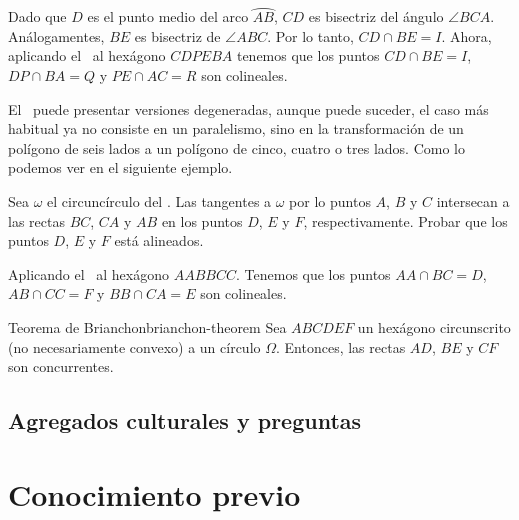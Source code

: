 \begin{solution}
    Dado que $D$ es el punto medio del arco $\wideparen{AB}$, $CD$ es bisectriz del ángulo $\angle BCA$.
    Análogamentes, $BE$ es bisectriz de $\angle ABC$.
    Por lo tanto, $CD \cap BE = I$.
    Ahora, aplicando el~ al hexágono $CDPEBA$ tenemos que los puntos $CD \cap BE = I$, $DP \cap BA = Q$ y $PE \cap AC = R$ son colineales.
\end{solution}


El~ puede presentar versiones degeneradas, aunque puede suceder, el caso más habitual ya no consiste en un paralelismo, sino en la transformación de un polígono de seis lados a un polígono de cinco, cuatro o tres lados.
Como lo podemos ver en el siguiente ejemplo.

\begin{section-example.tcb}{}{}
    Sea $\omega$ el circuncírculo del .
    Las tangentes a $\omega$ por lo puntos $A$, $B$ y $C$ intersecan a las rectas $BC$, $CA$ y $AB$ en los puntos $D$, $E$ y $F$, respectivamente.
    Probar que los puntos $D$, $E$ y $F$ está alineados.
\end{section-example.tcb}

\begin{solution}
    Aplicando el~ al hexágono $AABBCC$.
    Tenemos que los puntos $AA \cap BC = D$, $AB \cap CC = F$ y $BB \cap CA = E$ son colineales.
\end{solution}

\begin{remark.tcb}

\end{remark.tcb}



\newpage
\begin{section-theorem.tcb}{Teorema de Brianchon}{brianchon-theorem}
    Sea $ABCDEF$ un hexágono circunscrito (no necesariamente convexo) a un círculo $\Omega$.
    Entonces, las rectas $AD$, $BE$ y $CF$ son concurrentes.
\end{section-theorem.tcb}




\subsection{Agregados culturales y preguntas}




\section{Conocimiento previo}

